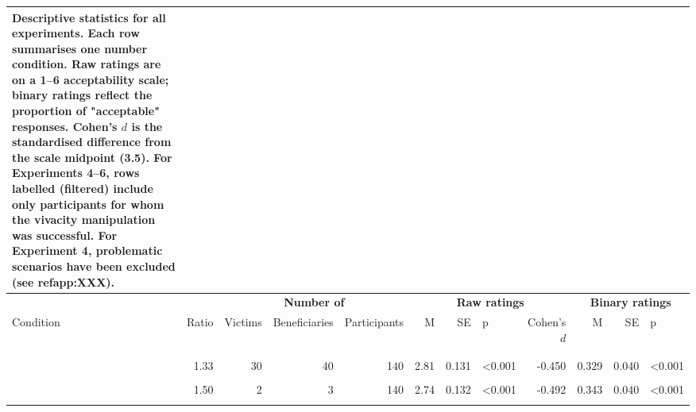 \documentclass[
]{article}
\begin{document}
\begingroup\fontsize{7}{9}\selectfont

\begin{longtable}[t]{lrrrrrrlrrrl}
\caption{\label{tab:descriptives-print2}Descriptive statistics for all experiments. Each row summarises one number condition. Raw ratings are on a 1--6 acceptability scale; binary ratings reflect the proportion of "acceptable" responses. Cohen's $d$ is the standardised difference from the scale midpoint (3.5). For Experiments 4--6, rows labelled (filtered) include only participants for whom the vivacity manipulation was successful. For Experiment 4, problematic scenarios have been excluded (see \\ref{app:XXX}).}\\
\toprule
\multicolumn{2}{c}{\textbf{ }} & \multicolumn{3}{c}{\textbf{Number of}} & \multicolumn{4}{c}{\textbf{Raw ratings}} & \multicolumn{3}{c}{\textbf{Binary ratings}} \\
\cmidrule(l{3pt}r{3pt}){3-5} \cmidrule(l{3pt}r{3pt}){6-9} \cmidrule(l{3pt}r{3pt}){10-12}
Condition & Ratio & Victims & Beneficiaries & Participants & M & SE & p & Cohen's $d$ & M & SE & p\\
\midrule
\addlinespace[0.3em]
\multicolumn{12}{l}{\textbf{Exp. 1a}}\\
\hspace{1em}\cellcolor{gray!10}{} & \cellcolor{gray!10}{1.33} & \cellcolor{gray!10}{3} & \cellcolor{gray!10}{4} & \cellcolor{gray!10}{140} & \cellcolor{gray!10}{2.76} & \cellcolor{gray!10}{0.132} & \cellcolor{gray!10}{<0.001} & \cellcolor{gray!10}{-0.477} & \cellcolor{gray!10}{0.336} & \cellcolor{gray!10}{0.040} & \cellcolor{gray!10}{<0.001}\\
\hspace{1em} & 1.33 & 30 & 40 & 140 & 2.81 & 0.131 & <0.001 & -0.450 & 0.329 & 0.040 & <0.001\\
\hspace{1em}\cellcolor{gray!10}{} & \cellcolor{gray!10}{1.33} & \cellcolor{gray!10}{300} & \cellcolor{gray!10}{400} & \cellcolor{gray!10}{140} & \cellcolor{gray!10}{2.75} & \cellcolor{gray!10}{0.130} & \cellcolor{gray!10}{<0.001} & \cellcolor{gray!10}{-0.491} & \cellcolor{gray!10}{0.343} & \cellcolor{gray!10}{0.040} & \cellcolor{gray!10}{<0.001}\\
\hspace{1em} & 1.50 & 2 & 3 & 140 & 2.74 & 0.132 & <0.001 & -0.492 & 0.343 & 0.040 & <0.001\\
\hspace{1em}\cellcolor{gray!10}{} & \cellcolor{gray!10}{1.50} & \cellcolor{gray!10}{20} & \cellcolor{gray!10}{30} & \cellcolor{gray!10}{140} & \cellcolor{gray!10}{2.89} & \cellcolor{gray!10}{0.133} & \cellcolor{gray!10}{<0.001} & \cellcolor{gray!10}{-0.390} & \cellcolor{gray!10}{0.379} & \cellcolor{gray!10}{0.041} & \cellcolor{gray!10}{0.005}\\

\end{longtable}
\end{document}
